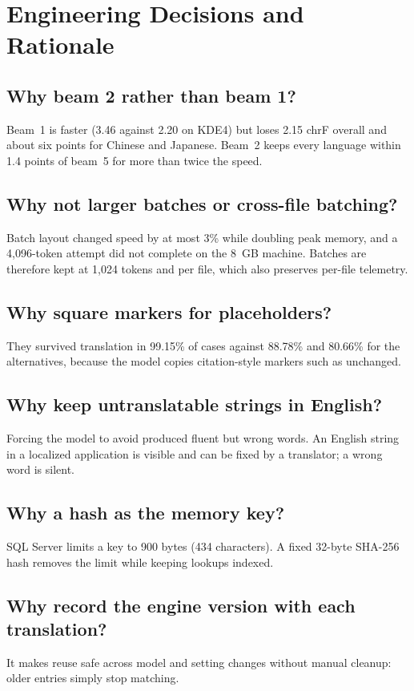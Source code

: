 \section{Engineering Decisions and Rationale}
\label{sec:decisions}

\subsection{Why beam 2 rather than beam 1?}
Beam~1 is faster (3.46\x{} against 2.20\x{} on KDE4) but loses 2.15 chrF overall and about six points for Chinese and
Japanese. Beam~2 keeps every language within 1.4 points of beam~5 for more than twice the speed.

\subsection{Why not larger batches or cross-file batching?}
Batch layout changed speed by at most 3\% while doubling peak memory, and a 4,096-token attempt did not complete on the
8~GB machine. Batches are therefore kept at 1,024 tokens and per file, which also preserves per-file telemetry.

\subsection{Why square markers for placeholders?}
They survived translation in 99.15\% of cases against 88.78\% and 80.66\% for the alternatives, because the model copies
citation-style markers such as \code{[1]} unchanged.

\subsection{Why keep untranslatable strings in English?}
Forcing the model to avoid  produced fluent but wrong words. An English string in a localized application is
visible and can be fixed by a translator; a wrong word is silent.

\subsection{Why a hash as the memory key?}
SQL Server limits a key to 900 bytes (434 characters). A fixed 32-byte SHA-256 hash removes the limit while keeping
lookups indexed.

\subsection{Why record the engine version with each translation?}
It makes reuse safe across model and setting changes without manual cleanup: older entries simply stop matching.

